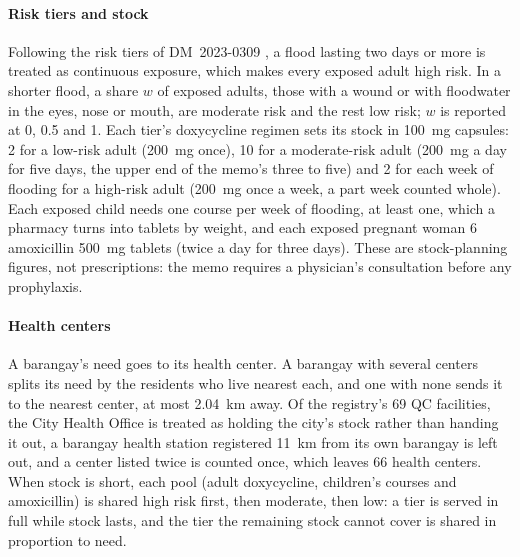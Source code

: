 \paragraph{Risk tiers and stock}
Following the risk tiers of DM~\mbox{2023-0309} \parencite{doh2023}, a flood lasting two days or
more is treated as continuous exposure, which makes every exposed adult high risk. In a shorter
flood, a share $w$ of exposed adults, those with a wound or with floodwater in the eyes, nose or
mouth, are moderate risk and the rest low risk; $w$ is reported at 0, 0.5 and 1. Each tier's doxycycline regimen sets
its stock in 100~mg capsules: 2 for a low-risk adult (200~mg once), 10 for a moderate-risk adult
(200~mg a day for five days, the upper end of the memo's three to five) and 2 for each week of
flooding for a high-risk adult (200~mg once a week, a part week counted whole). Each exposed child
needs one course per week of flooding, at least one, which a pharmacy turns into tablets by
weight, and each exposed pregnant woman 6 amoxicillin 500~mg tablets (twice a day for three days).
These are stock-planning figures, not prescriptions: the memo requires a physician's consultation
before any prophylaxis.

\paragraph{Health centers}
A barangay's need goes to its health center. A barangay with several centers splits its need by
the residents who live nearest each, and one with none sends it to the nearest center, at most
2.04~km away. Of the registry's 69 QC facilities, the City Health Office is treated as holding
the city's stock rather than handing it out, a barangay health station registered 11~km from its
own barangay is left out, and a center listed twice is counted once, which leaves 66 health
centers.
When stock is short, each pool (adult doxycycline, children's courses and amoxicillin) is shared
high risk first, then moderate, then low: a tier is served in full while stock lasts, and the tier
the remaining stock cannot cover is shared in proportion to need.

